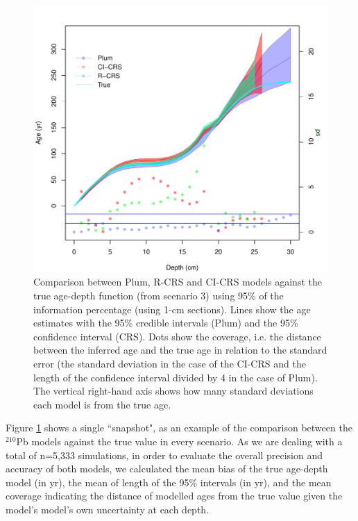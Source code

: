 \documentclass [10pt] {article}
\begin{document}
\begin{figure}[!]
	\centering
	\includegraphics[width=\linewidth]{95Comparison.pdf}
		\caption{Comparison between Plum, R-CRS and CI-CRS models against the true age-depth function (from scenario 3) using 95\% of the information percentage (using 1-cm sections). Lines show the age estimates with the 95\% credible intervals (Plum) and the 95\% confidence interval (CRS). Dots show the coverage, i.e. the distance between the inferred age and the true age in relation to the standard error (the standard deviation in the case of the CI-CRS and the length of the confidence interval divided by 4 in the case of Plum). The vertical right-hand axis shows how many standard deviations each model is from the true age.  }
		\label{fig:comparison1r}
\end{figure}

Figure \ref{fig:comparison1r} shows a single ``snapshot", as an example of the comparison between the $^{210}$Pb models against the true value in every scenario. 
As we are dealing with a total of n=5,333 simulations, in order to evaluate the overall precision and accuracy of both models, we calculated the mean bias of the true age-depth model (in yr), the mean of length of the 95\% intervals (in yr), and the mean coverage indicating the distance of modelled ages from the true value given the model’s model's own uncertainty at each depth.
\end{document}
